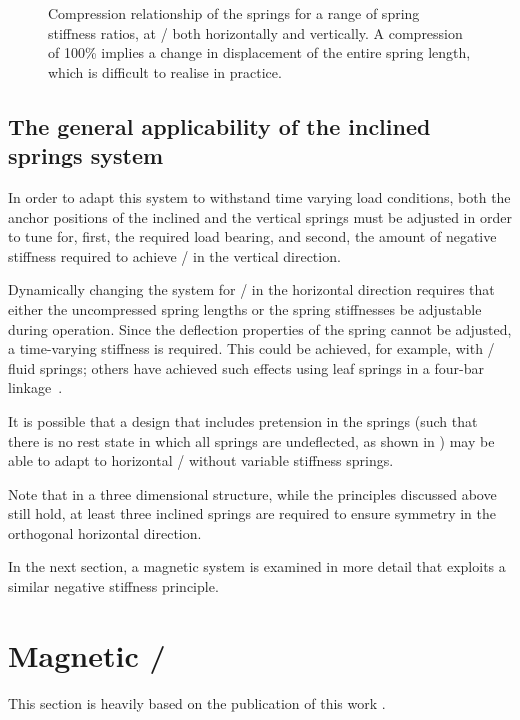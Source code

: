 \documentclass[11pt,a4paper]{memoir}
\begin{document}
\begin{figure}
\caption{Compression relationship of the springs for a range of spring
stiffness ratios, at \qzs/ both horizontally and vertically. A compression of
100\% implies a change in displacement of the entire spring length, which is
difficult to realise in practice.}
\end{figure}

\subsection{The general applicability of the inclined springs system}

In order to adapt this system to withstand time varying load conditions, both
the anchor positions of the inclined and the vertical springs must be adjusted
in order to tune for, first, the required load bearing, and second, the amount
of negative stiffness required to achieve \qzs/ in the vertical direction.

Dynamically changing the system for \qzs/ in the horizontal direction requires
that either the uncompressed spring lengths or the spring stiffnesses be
adjustable during operation. Since the deflection properties of the spring
cannot be adjusted, a time-varying stiffness is required. This could be
achieved, for example, with \magnetorh/ fluid springs; others have achieved
such effects using leaf springs in a four-bar linkage~\cite{choi2011-ietr}.

It is possible that a design that includes pretension in the springs (such
that there is no rest state in which all springs are undeflected, as shown in
) may be able to adapt to horizontal \qzs/ without variable
stiffness springs.

Note that in a three dimensional structure, while the principles discussed
above still hold, at least three inclined springs are required to ensure
symmetry in the orthogonal horizontal direction.

In the next section, a magnetic system is examined in more detail that
exploits a similar negative stiffness principle.

\section{Magnetic \qzs/}

This section is heavily based on the publication of this work \parencite{robertson2009-jsv}.
\end{document}
